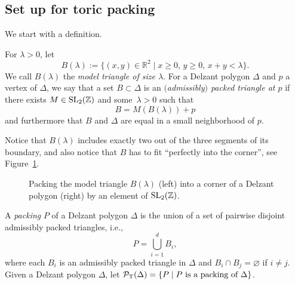 \documentclass[pdftex]{sigma}
\numberwithin{equation}{section}
\def\R{{\mathbb R}}
\def\Z{{\mathbb Z}}
\newcommand{\De}{\Delta}
\newcommand{\PT}{\mathcal{P}_{\rm T}}
\newcommand{\SL}{{\rm SL}_2(\Z)}
\begin{document}
\subsection{Set up for toric packing}
We start with a definition.



\begin{Definition}\label{def:packedtriangle}
For $\lambda>0$, let
\[
B(\lambda) := \big\{(x,y)\in\R^2\mid x\geq 0, \,y\geq 0,\, x+y<\lambda\big\}.
\]
We call $B(\lambda)$ the \emph{model triangle of size $\lambda$}.
For a Delzant polygon $\De$ and $p$ a vertex of $\De$, we say that a set $B\subset \De$ is an \emph{$($admissibly$)$ packed triangle at $p$} if there exists $M \in \SL$ and some~$\lambda>0$ such that
\[B = M(B(\lambda)) + p\]
and furthermore that $B$ and $\De$ are equal in a small neighborhood of $p$.
\end{Definition}

Notice that $B(\lambda)$ includes exactly two out of the three segments of its boundary, and also notice that $B$ has to fit ``perfectly into the corner'', see Figure~\ref{fig:packing_ex}.






\begin{figure}
 \centering
 \caption{Packing the model triangle $B(\lambda)$ (left) into a corner of a Delzant polygon (right) by an element of $\SL$.}
 \label{fig:packing_ex}
\end{figure}



\begin{Definition}\label{def:DPacking}
A \emph{packing} $P$ of a Delzant polygon $\De$ is the union of a set of pairwise disjoint admissibly packed triangles, i.e.,
\[P = \bigcup_{i=1}^d B_i,\]
where each $B_i$ is an admissibly packed triangle in $\De$ and $B_i \cap B_j = \varnothing$
if $i \neq j$.
Given a Delzant polygon $\De$, let $\PT(\De) = \{P \mid P \text{ is a packing of } \De \}$.
\end{Definition}
\end{document}
